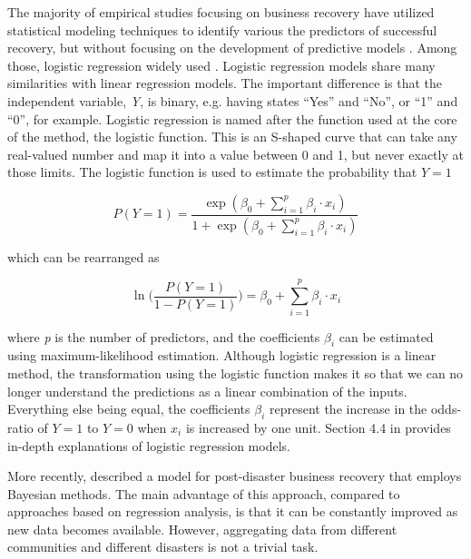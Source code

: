 The majority of empirical studies focusing on business recovery have utilized statistical modeling techniques to identify various the predictors of successful recovery, but without focusing on the development of predictive models \citep{aghababaei2020quantifying}. Among those, logistic regression widely used  \citep{watson2020importance,marshall2015predicting,dahlhamer1998rebounding}. Logistic regression models share many similarities with linear regression models. The important difference is that the independent variable, \textit{Y}, is binary, e.g. having states ``Yes'' and ``No'', or ``1'' and ``0'', for example. Logistic regression is named after the function used at the core of the method, the logistic function. This is an S-shaped curve that can take any real-valued number and map it into a value between 0 and 1, but never exactly at those limits. The logistic function is used to estimate the probability that $Y=1$

\begin{equation}
    P(Y=1) = \frac{\exp(\beta_0 + \sum_{i=1}^{p}\beta_i \cdot x_i)}{1 + \exp(\beta_0 + \sum_{i=1}^{p}\beta_i \cdot x_i)}
    \label{eq:probability}
\end{equation}

\noindent which can be rearranged as

\begin{equation}
    \ln \Bigg(\frac{P(Y=1)}{1-P(Y=1)}\Bigg) = \beta_0 + \sum_{i=1}^{p}\beta_i \cdot x_i 
    \label{eq:logit}
\end{equation}

\noindent where \textit{p} is the number of predictors, and the coefficients $\beta_i$ can be estimated using maximum-likelihood estimation. Although logistic regression is a linear method, the transformation using the logistic function makes it so that we can no longer understand the predictions as a linear combination of the inputs. Everything else being equal, the coefficients $\beta_i$ represent the increase in the odds-ratio of $Y=1$ to $Y=0$ when $x_i$ is increased by one unit. Section 4.4 in \cite{friedman2001elements} provides in-depth explanations of logistic regression models.\

More recently, \cite{aghababaei2020quantifying} described a model for post-disaster business recovery that employs Bayesian methods. The main advantage of this approach, compared to approaches based on regression analysis, is that it can be constantly improved as new data becomes available. However, aggregating data from different communities and different disasters is not a trivial task.\

